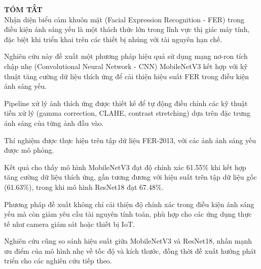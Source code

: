 
{\LARGE \textbf{TÓM TẮT}} \\[1cm]

Nhận diện biểu cảm khuôn mặt (Facial Expression Recognition - FER) trong điều kiện ánh sáng yếu là một thách thức lớn trong lĩnh vực thị giác máy tính, đặc biệt khi triển khai trên các thiết bị nhúng với tài nguyên hạn chế.

Nghiên cứu này đề xuất một phương pháp hiệu quả sử dụng mạng nơ-ron tích chập nhẹ (Convolutional Neural Network - CNN) MobileNetV3 kết hợp với kỹ thuật tăng cường dữ liệu thích ứng để cải thiện hiệu suất FER trong điều kiện ánh sáng yếu.

Pipeline xử lý ảnh thích ứng được thiết kế để tự động điều chỉnh các kỹ thuật tiền xử lý (gamma correction, CLAHE, contrast stretching) dựa trên đặc trưng ánh sáng của từng ảnh đầu vào.

Thí nghiệm được thực hiện trên tập dữ liệu FER-2013, với các ảnh ánh sáng yếu được mô phỏng.

Kết quả cho thấy mô hình MobileNetV3 đạt độ chính xác 61.55\% khi kết hợp tăng cường dữ liệu thích ứng, gần tương đương với hiệu suất trên tập dữ liệu gốc (61.63\%), trong khi mô hình ResNet18 đạt 67.48\%.

Phương pháp đề xuất không chỉ cải thiện độ chính xác trong điều kiện ánh sáng yếu mà còn giảm yêu cầu tài nguyên tính toán, phù hợp cho các ứng dụng thực tế như camera giám sát hoặc thiết bị IoT.

Nghiên cứu cũng so sánh hiệu suất giữa MobileNetV3 và ResNet18, nhấn mạnh ưu điểm của mô hình nhẹ về tốc độ và kích thước, đồng thời đề xuất hướng phát triển cho các nghiên cứu tiếp theo.